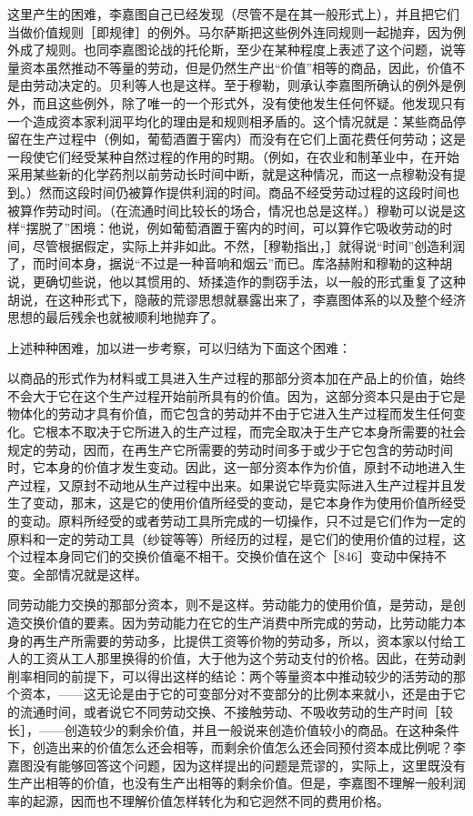 这里产生的困难，李嘉图自己已经发现（尽管不是在其一般形式上），并且把它们当做价值规则［即规律］的例外。马尔萨斯把这些例外连同规则一起抛弃，因为例外成了规则。也同李嘉图论战的托伦斯，至少在某种程度上表述了这个问题，说等量资本虽然推动不等量的劳动，但是仍然生产出“价值”相等的商品，因此，价值不是由劳动决定的。贝利等人也是这样。至于穆勒，则承认李嘉图所确认的例外是例外，而且这些例外，除了唯一的一个形式外，没有使他发生任何怀疑。他发现只有一个造成资本家利润平均化的理由是和规则相矛盾的。这个情况就是：某些商品停留在生产过程中（例如，葡萄酒置于窖内）而没有在它们上面花费任何劳动；这是一段使它们经受某种自然过程的作用的时期。（例如，在农业和制革业中，在开始采用某些新的化学药剂以前劳动长时间中断，就是这种情况，而这一点穆勒没有提到。）然而这段时间仍被算作提供利润的时间。商品不经受劳动过程的这段时间也被算作劳动时间。（在流通时间比较长的场合，情况也总是这样。）穆勒可以说是这样“摆脱了”困境：他说，例如葡萄酒置于窖内的时间，可以算作它吸收劳动的时间，尽管根据假定，实际上并非如此。不然，［穆勒指出，］就得说“时间”创造利润了，而时间本身，据说“不过是一种音响和烟云”而已。库洛赫附和穆勒的这种胡说，更确切些说，他以其惯用的、矫揉造作的剽窃手法，以一般的形式重复了这种胡说，在这种形式下，隐蔽的荒谬思想就暴露出来了，李嘉图体系的以及整个经济思想的最后残余也就被顺利地抛弃了。

上述种种困难，加以进一步考察，可以归结为下面这个困难：

以商品的形式作为材料或工具进入生产过程的那部分资本加在产品上的价值，始终不会大于它在这个生产过程开始前所具有的价值。因为，这部分资本只是由于它是物体化的劳动才具有价值，而它包含的劳动并不由于它进入生产过程而发生任何变化。它根本不取决于它所进入的生产过程，而完全取决于生产它本身所需要的社会规定的劳动，因而，在再生产它所需要的劳动时间多于或少于它包含的劳动时间时，它本身的价值才发生变动。因此，这一部分资本作为价值，原封不动地进入生产过程，又原封不动地从生产过程中出来。如果说它毕竟实际进入生产过程并且发生了变动，那末，这是它的使用价值所经受的变动，是它本身作为使用价值所经受的变动。原料所经受的或者劳动工具所完成的一切操作，只不过是它们作为一定的原料和一定的劳动工具（纱锭等等）所经历的过程，是它们的使用价值的过程，这个过程本身同它们的交换价值毫不相干。交换价值在这个［846］变动中保持不变。全部情况就是这样。

同劳动能力交换的那部分资本，则不是这样。劳动能力的使用价值，是劳动，是创造交换价值的要素。因为劳动能力在它的生产消费中所完成的劳动，比劳动能力本身的再生产所需要的劳动多，比提供工资等价物的劳动多，所以，资本家以付给工人的工资从工人那里换得的价值，大于他为这个劳动支付的价格。因此，在劳动剥削率相同的前提下，可以得出这样的结论：两个等量资本中推动较少的活劳动的那个资本，——这无论是由于它的可变部分对不变部分的比例本来就小，还是由于它的流通时间，或者说它不同劳动交换、不接触劳动、不吸收劳动的生产时间［较长］，——创造较少的剩余价值，并且一般说来创造价值较小的商品。在这种条件下，创造出来的价值怎么还会相等，而剩余价值怎么还会同预付资本成比例呢？李嘉图没有能够回答这个问题，因为这样提出的问题是荒谬的，实际上，这里既没有生产出相等的价值，也没有生产出相等的剩余价值。但是，李嘉图不理解一般利润率的起源，因而也不理解价值怎样转化为和它迥然不同的费用价格。

